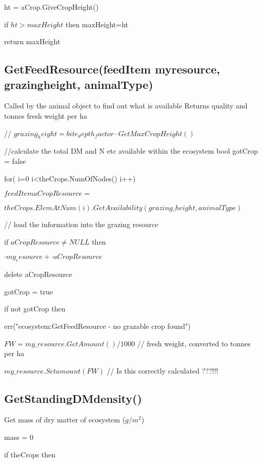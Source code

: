 \documentclass[%
]{scrartcl}
\begin{document}
{{{\quad   \quad        ht = aCrop.GiveCropHeight()
    
\quad  \quad       if $ht>maxHeight$ then
             maxHeight=ht
    
   
   return maxHeight




\subsection{GetFeedResource(feedItem myresource, grazingheight, animalType)}
Called by the animal object to find out what is available
Returns quality and tonnes fresh weight per ha

//     $grazing_height= bite_depth_factor  \cdot  GetMaxCropHeight()$
 
   //calculate the total DM and N etc available within the ecosystem
   bool gotCrop = false
  
 for( i=0 i<theCrops.NumOfNodes() i++)
     
 $feedItem  aCropResource =$

$ theCrops.ElemAtNum(i).GetAvailability(grazing\_height, animalType)$
     
 // load the information into the grazing resource
     
 if $aCropResource\ne NULL$ then
      
  
 \quad       $ \cdot my_resource +  \cdot aCropResource$
  
  \quad      delete aCropResource
   
 \quad      gotCrop = true
      
   

   if not gotCrop then

    \quad       err("ecosystem:GetFeedResource - no grazable crop found")
    
 $FW = my\_resource.GetAmount()/1000 $ // fresh weight, converted to tonnes per ha
   
$my\_resource.Setamount(FW)$  // Is this correctly calculated ???!!!



 \subsection{GetStandingDMdensity()}

Get mass of dry matter of ecosystem ($g/m^2$)
	  
	  mass = 0
	  
   if theCrops then
   
}}}
\end{document}
